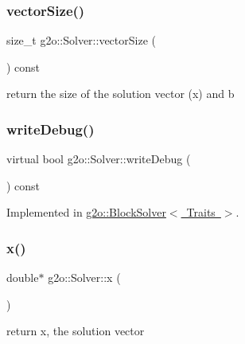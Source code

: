 \subsubsection{\texorpdfstring{vector\+Size()}{vectorSize()}}
{\footnotesize\ttfamily size\+\_\+t g2o\+::\+Solver\+::vector\+Size (\begin{DoxyParamCaption}{ }\end{DoxyParamCaption}) const\hspace{0.3cm}{\ttfamily [inline]}}



return the size of the solution vector (x) and b 

\mbox{\label{classg2o_1_1_solver_a0f6f14940eccea0f9bf9e2ea144c9b4d}} 
\subsubsection{\texorpdfstring{write\+Debug()}{writeDebug()}}
{\footnotesize\ttfamily virtual bool g2o\+::\+Solver\+::write\+Debug (\begin{DoxyParamCaption}{ }\end{DoxyParamCaption}) const\hspace{0.3cm}{\ttfamily [pure virtual]}}



Implemented in \mbox{\hyperlink{classg2o_1_1_block_solver_aab81798b80dcb6c4182fa1d510914234}{g2o\+::\+Block\+Solver$<$ Traits $>$}}.

\mbox{\label{classg2o_1_1_solver_acb097d8568624a1f3af4dba808e5593b}} 
\subsubsection{\texorpdfstring{x()}{x()}\hspace{0.1cm}{\footnotesize\ttfamily [1/2]}}
{\footnotesize\ttfamily double$\ast$ g2o\+::\+Solver\+::x (\begin{DoxyParamCaption}{ }\end{DoxyParamCaption})\hspace{0.3cm}{\ttfamily [inline]}}



return x, the solution vector 

